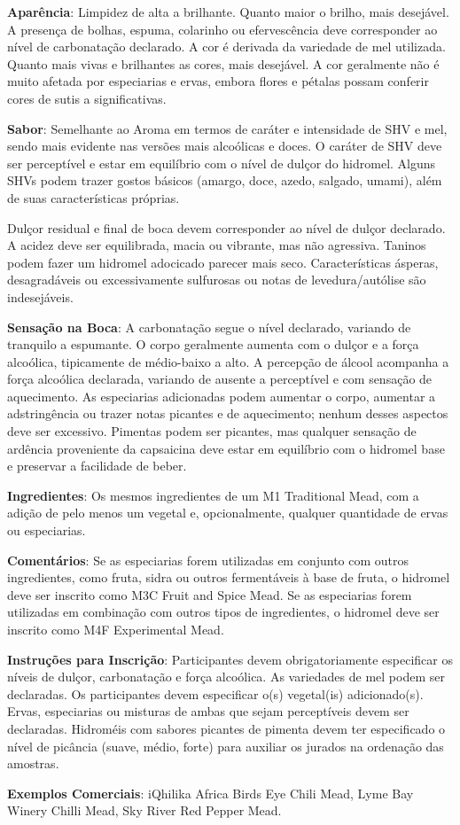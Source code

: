 \textbf{Aparência}: Limpidez de alta a brilhante. Quanto maior o brilho, mais desejável. A presença de bolhas, espuma, colarinho ou efervescência deve corresponder ao nível de carbonatação declarado. A cor é derivada da variedade de mel utilizada. Quanto mais vivas e brilhantes as cores, mais desejável. A cor geralmente não é muito afetada por especiarias e ervas, embora flores e pétalas possam conferir cores de sutis a significativas.

\textbf{Sabor}: Semelhante ao Aroma em termos de caráter e intensidade de SHV e mel, sendo mais evidente nas versões mais alcoólicas e doces. O caráter de SHV deve ser perceptível e estar em equilíbrio com o nível de dulçor do hidromel. Alguns SHVs podem trazer gostos básicos (amargo, doce, azedo, salgado, umami), além de suas características próprias.

Dulçor residual e final de boca devem corresponder ao nível de dulçor declarado. A acidez deve ser equilibrada, macia ou vibrante, mas não agressiva. Taninos podem fazer um hidromel adocicado parecer mais seco. Características ásperas, desagradáveis ou excessivamente sulfurosas ou notas de levedura/autólise são indesejáveis.

\textbf{Sensação na Boca}: A carbonatação segue o nível declarado, variando de tranquilo a espumante. O corpo geralmente aumenta com o dulçor e a força alcoólica, tipicamente de médio-baixo a alto. A percepção de álcool acompanha a força alcoólica declarada, variando de ausente a perceptível e com sensação de aquecimento. As especiarias adicionadas podem aumentar o corpo, aumentar a adstringência ou trazer notas picantes e de aquecimento; nenhum desses aspectos deve ser excessivo. Pimentas podem ser picantes, mas qualquer sensação de ardência proveniente da capsaicina deve estar em equilíbrio com o hidromel base e preservar a facilidade de beber.

\textbf{Ingredientes}: Os mesmos ingredientes de um M1 Traditional Mead, com a adição de pelo menos um vegetal e, opcionalmente, qualquer quantidade de ervas ou especiarias.

\textbf{Comentários}: Se as especiarias forem utilizadas em conjunto com outros ingredientes, como fruta, sidra ou outros fermentáveis à base de fruta, o hidromel deve ser inscrito como M3C Fruit and Spice Mead. Se as especiarias forem utilizadas em combinação com outros tipos de ingredientes, o hidromel deve ser inscrito como M4F Experimental Mead.

\textbf{Instruções para Inscrição}: Participantes devem obrigatoriamente especificar os níveis de dulçor, carbonatação e força alcoólica. As variedades de mel podem ser declaradas. Os participantes devem especificar o(s) vegetal(is) adicionado(s). Ervas, especiarias ou misturas de ambas que sejam perceptíveis devem ser declaradas. Hidroméis com sabores picantes de pimenta devem ter especificado o nível de picância (suave, médio, forte) para auxiliar os jurados na ordenação das amostras.

\textbf{Exemplos Comerciais}: iQhilika Africa Birds Eye Chili Mead, Lyme Bay Winery Chilli Mead, Sky River Red Pepper Mead.
